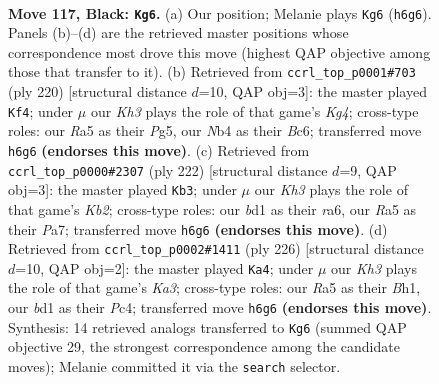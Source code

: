 \documentclass[11pt]{article}
\begin{document}
\clearpage

\begin{figure}[p]\centering
\begin{subfigure}{0.46\textwidth}\centering
\resizebox{\linewidth}{!}{%
\newchessgame
\chessboard[
  setfen={8/8/7k/r5p1/1n6/6K1/8/3B4 b - - 19 117},
  showmover=false,
  pgfstyle=straightmove, color=movearrow, markmove={h6-g6}
]}
\caption{}
\end{subfigure}\hfill
\begin{subfigure}{0.46\textwidth}\centering
\resizebox{\linewidth}{!}{%
\newchessgame
\chessboard[
  setfen={8/5k2/2B5/5PP1/6K1/8/8/b7 w - - 71 111},
  showmover=false,
  pgfstyle=straightmove, color=movearrow, markmove={g4-f4}
]}
\caption{}
\end{subfigure}
\\[4pt]
\begin{subfigure}{0.46\textwidth}\centering
\resizebox{\linewidth}{!}{%
\newchessgame
\chessboard[
  setfen={8/P3R3/r7/2k5/8/2P5/1K6/8 w - - 15 112},
  showmover=false,
  pgfstyle=straightmove, color=movearrow, markmove={b2-b3}
]}
\caption{}
\end{subfigure}\hfill
\begin{subfigure}{0.46\textwidth}\centering
\resizebox{\linewidth}{!}{%
\newchessgame
\chessboard[
  setfen={8/8/1k6/6b1/1PP5/K7/8/7B w - - 67 114},
  showmover=false,
  pgfstyle=straightmove, color=movearrow, markmove={a3-a4}
]}
\caption{}
\end{subfigure}
\caption{\textbf{Move 117, Black: \texttt{Kg6}.} (a) Our position; Melanie plays \texttt{Kg6} (\texttt{h6g6}). Panels (b)--(d) are the retrieved master positions whose correspondence most drove this move (highest QAP objective among those that transfer to it). (b) Retrieved from \texttt{ccrl\_top\_p0001\#703} (ply 220) [structural distance $d$=10, QAP obj=3]: the master played \texttt{Kf4}; under $\mu$ our \emph{Kh3} plays the role of that game's \emph{Kg4}; cross-type roles: our \emph{R}a5 as their \emph{P}g5, our \emph{N}b4 as their \emph{B}c6; transferred move \texttt{h6g6} \textbf{(endorses this move)}. (c) Retrieved from \texttt{ccrl\_top\_p0000\#2307} (ply 222) [structural distance $d$=9, QAP obj=3]: the master played \texttt{Kb3}; under $\mu$ our \emph{Kh3} plays the role of that game's \emph{Kb2}; cross-type roles: our \emph{b}d1 as their \emph{r}a6, our \emph{R}a5 as their \emph{P}a7; transferred move \texttt{h6g6} \textbf{(endorses this move)}. (d) Retrieved from \texttt{ccrl\_top\_p0002\#1411} (ply 226) [structural distance $d$=10, QAP obj=2]: the master played \texttt{Ka4}; under $\mu$ our \emph{Kh3} plays the role of that game's \emph{Ka3}; cross-type roles: our \emph{R}a5 as their \emph{B}h1, our \emph{b}d1 as their \emph{P}c4; transferred move \texttt{h6g6} \textbf{(endorses this move)}. Synthesis: 14 retrieved analogs transferred to \texttt{Kg6} (summed QAP objective 29, the strongest correspondence among the candidate moves); Melanie committed it via the \texttt{search} selector.}
\label{fig:thought-m233}
\end{figure}
\end{document}
